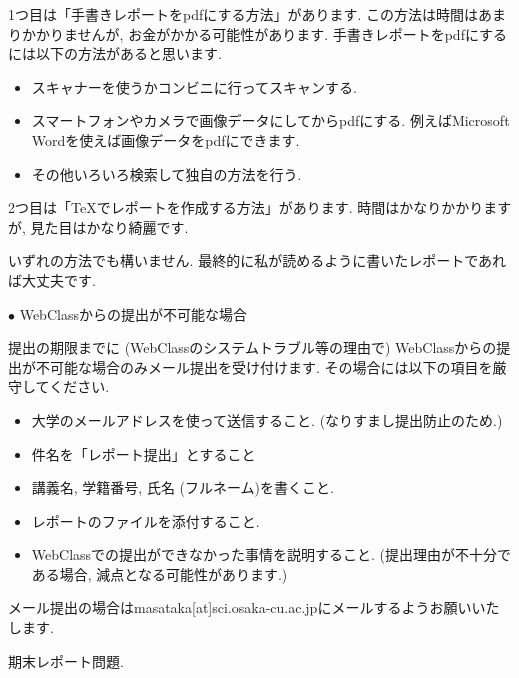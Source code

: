 \documentclass[dvipdfmx,a4paper,11pt]{article}
\theoremstyle{definition}
\begin{document}
1つ目は「手書きレポートをpdfにする方法」があります.
この方法は時間はあまりかかりませんが, お金がかかる可能性があります.
手書きレポートをpdfにするには以下の方法があると思います.
\begin{itemize}
\setlength{\parskip}{0cm} %
  \setlength{\itemsep}{0cm}
\item スキャナーを使うかコンビニに行ってスキャンする.
\item スマートフォンやカメラで画像データにしてからpdfにする. 例えばMicrosoft Wordを使えば画像データをpdfにできます. %
\item その他いろいろ検索して独自の方法を行う.
\end{itemize}

2つ目は「TeXでレポートを作成する方法」があります.
時間はかなりかかりますが, 見た目はかなり綺麗です.
\vspace{11pt}


いずれの方法でも構いません. 最終的に私が読めるように書いたレポートであれば大丈夫です.

\vspace{11pt}
 \hspace{-11pt}
{\Large $\bullet$ WebClassからの提出が不可能な場合}
\vspace{11pt}

提出の期限までに (WebClassのシステムトラブル等の理由で) WebClassからの提出が不可能な場合のみメール提出を受け付けます.
その場合には以下の項目を厳守してください.
\begin{itemize}
\setlength{\parskip}{0cm} %
  \setlength{\itemsep}{0cm}
\item 大学のメールアドレスを使って送信すること. (なりすまし提出防止のため.)
\item 件名を「レポート提出」とすること
\item 講義名, 学籍番号, 氏名 (フルネーム)を書くこと.
\item レポートのファイルを添付すること.
\item WebClassでの提出ができなかった事情を説明すること. (提出理由が不十分である場合, 減点となる可能性があります.)
\end{itemize}

メール提出の場合はmasataka[at]sci.osaka-cu.ac.jpにメールするようお願いいたします.

\newpage
\begin{center}
{\LARGE 期末レポート問題.} 
\end{center}
\end{document}
